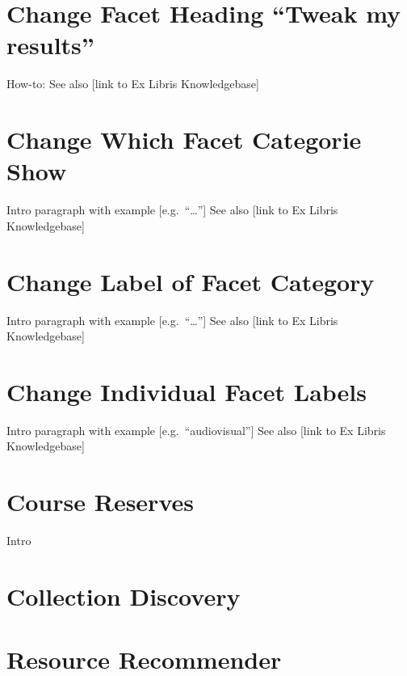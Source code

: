 \documentclass[
  openany]{book}
\begin{document}
\hypertarget{change-facet-heading-tweak-my-results}{%
\section{Change Facet Heading ``Tweak my results''}\label{change-facet-heading-tweak-my-results}}

How-to:
See also {[}link to Ex Libris Knowledgebase{]}

\hypertarget{change-which-facet-categorie-show}{%
\section{Change Which Facet Categorie Show}\label{change-which-facet-categorie-show}}

Intro paragraph with example {[}e.g.~``\ldots{}''{]}
See also {[}link to Ex Libris Knowledgebase{]}

\hypertarget{change-label-of-facet-category}{%
\section{Change Label of Facet Category}\label{change-label-of-facet-category}}

Intro paragraph with example {[}e.g.~``\ldots{}''{]}
See also {[}link to Ex Libris Knowledgebase{]}

\hypertarget{change-individual-facet-labels}{%
\section{Change Individual Facet Labels}\label{change-individual-facet-labels}}

Intro paragraph with example {[}e.g.~``audiovisual''{]}
See also {[}link to Ex Libris Knowledgebase{]}

\hypertarget{course-reserves}{%
\section{Course Reserves}\label{course-reserves}}

Intro

\hypertarget{collection-discovery}{%
\section{Collection Discovery}\label{collection-discovery}}

\hypertarget{resource-recommender}{%
\section{Resource Recommender}\label{resource-recommender}}
\end{document}
